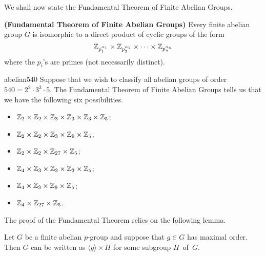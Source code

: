  
\medskip

We shall now state the Fundamental Theorem of Finite Abelian Groups. 
 
 
\begin{theorem}
{\bf (Fundamental Theorem of Finite Abelian
Groups)} 
Every finite abelian group $G$ is isomorphic to a direct product of
cyclic groups of the form 
\[
{\Bbb Z}_{p_1^{ \alpha_1 }}
\times
{\Bbb Z}_{p_2^{ \alpha_2 }}
\times
\cdots
\times
{\Bbb Z}_{p_n^{ \alpha_n }}
\]
where the $p_i$'s are primes (not necessarily distinct).
\end{theorem}
 
 
\begin{example}{abelian540}
Suppose that we wish to classify all abelian groups of order $540=2^2
\cdot 3^3 \cdot 5$.  The Fundamental Theorem of Finite Abelian Groups 
tells us that we have the following six possibilities.
\begin{itemize}
 
\item
${\Bbb Z}_2 \times {\Bbb Z}_2 \times {\Bbb Z}_3
\times {\Bbb Z}_3 \times {\Bbb Z}_3 \times {\Bbb Z}_5$;
 
\item
${\Bbb Z}_2 \times {\Bbb Z}_2 \times {\Bbb Z}_3
\times {\Bbb Z}_9 \times {\Bbb Z}_5$;
 
 
\item
${\Bbb Z}_2 \times {\Bbb Z}_2
\times {\Bbb Z}_{27} \times {\Bbb Z}_5$;
 
 
\item
${\Bbb Z}_4 \times {\Bbb Z}_3
\times {\Bbb Z}_3 \times {\Bbb Z}_3 \times {\Bbb Z}_5$;
 
\item
${\Bbb Z}_4 \times {\Bbb Z}_3
\times {\Bbb Z}_9 \times {\Bbb Z}_5$;
 
\item
${\Bbb Z}_4 \times {\Bbb Z}_{27} \times {\Bbb Z}_5$.
 
\end{itemize}
\end{example}
 
The  proof of the Fundamental Theorem relies on the following lemma.

\begin{lemma}\label{struct:lemma:finite_abelian}
Let $G$ be a finite abelian $p$-group and suppose that $g \in G$ has
maximal order. Then $G$ can be written as $\langle g \rangle \times H$
for some subgroup $H$~of~$G$. 
\end{lemma}
 
